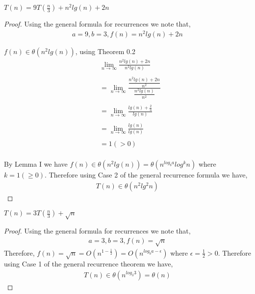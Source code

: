 \documentclass[12pt]{article}
\newenvironment{lemma}[2][Lemma]{\begin{trivlist}
\item[\hskip \labelsep {\bfseries #1}\hskip \labelsep {\bfseries #2.}]}{\end{trivlist}}
\newenvironment{question}[2][Question]{\begin{trivlist}
\item[\hskip \labelsep {\bfseries #1}\hskip \labelsep {\bfseries #2.}]}{\end{trivlist}}
\begin{document}
\begin{question}{5 (a)} $T(n) = 9T(\frac{n}{3}) + n^{2}lg(n) + 2n$
  \leavevmode \\
  \begin{proof}
  Using the general formula for recurrences we note that,
  \begin{align*}
    a = 9, b = 3, f(n) = n^{2}lg(n) + 2n
  \end{align*}

    \begin{lemma}{I} $f(n) \in \theta(n^{2}lg(n))$, using Theorem 0.2
      \begin{align*}
        &\lim_{n\to\infty} \frac{
        n^{2}lg(n) + 2n
      }{
        n^{2}lg(n)
      }\\ \\
      & = \lim_{n\to\infty} \frac{
        \dfrac{
          n^{2}lg(n) + 2n
        }{n^{2}}
      }{
        \dfrac{
          n^{2}lg(n)
        }{n^{2}}
      }\\ \\
      & = \lim_{n\to\infty} \frac{
        lg(n) + \frac{2}{n}
      }{
        lg(n)
      }\\ \\
      & = \lim_{n\to\infty} \frac{
        lg(n)
      }{
        lg(n)
      }\\ \\
      & = 1 (> 0)\\
      \end{align*}
    \end{lemma}

    By Lemma I we have $f(n) \in \theta(n^{2}lg(n)) = \theta(n^{log_{b}a}log^{k}n)$ where $k = 1 (\geq 0)$.
    Therefore using Case 2 of the general recurrence formula we have,
    \begin{align*}
      T(n) \in \theta(n^{2}lg^{2}n)
    \end{align*}
  \end{proof}
\end{question}

\begin{question}{5 (b)} $T(n) = 3T(\frac{n}{3}) + \sqrt{n}$
  \leavevmode \\
  \begin{proof}
    Using the general formula for recurrences we note that,
    \begin{align*}
      a = 3, b = 3, f(n) = \sqrt{n}
    \end{align*}
    Therefore, $f(n) = \sqrt{n} = O(n^{1 - \frac{1}{2}}) = O(n^{log_{b}a - \epsilon})$
    where $\epsilon = \frac{1}{2} > 0$.
    Therefore using Case 1 of the general recurrence theorem we have,
    \begin{align*}
      T(n) \in \theta(n^{log_{3}3}) = \theta(n)
    \end{align*}
  \end{proof}
\end{question}
\end{document}
